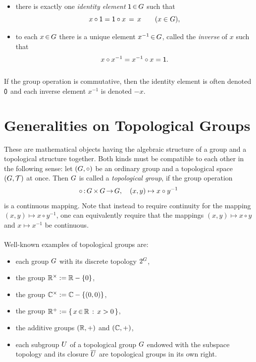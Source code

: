 \documentclass[11pt,twoside]{article}
\begin{document}
\begin{itemize}[leftmargin=12pt,itemsep=1pt]
\item[1.]
there is exactly one \textit{identity element} ${\mathsf{1}} {\,\in\,} G$ such that
\[
x \circ {\mathsf{1}} = {\mathsf{1}} \circ x \,=\, x \quad \quad (x \in G),
\]

\item[2.]
to each $x {\,\in\,} G$ there is a unique element $x^{-1} {\,\in\,} G$,
called the \textit{inverse} of $x$
such that
\[
x \circ x^{-1} = x^{-1} \circ x = {\mathsf{1}}.
\]
\end{itemize}

\subparagraph{}
If the group operation is commutative,
then the identity element is often denoted ${\mathsf{0}}$
and each inverse element $x^{-1}$ is denoted $-x$.

\section{Generalities on Topological Groups}                                   %
These are mathematical objects having the algebraic structure of a group
and a topological structure together.
Both kinds must be compatible to each other in the following sense:
let $(G,\circ)$ be an ordinary group and
a topological space $(G,\mathcal{T})$ at once.
Then $G$ is called a \textit{topological group},
if the group operation
\[
\circ {\,:\,} G {\,\times\,} G {\,\to\,} G,
\quad
(x,y) \mapsto x \circ y^{-1}
\]
is a continuous mapping.
Note that
instead to require continuity for the mapping $(x,y) \mapsto x \circ y^{-1}$,
one can equivalently require
that the mappings $(x,y) \mapsto x \circ y$ and $x \mapsto x^{-1}$
be continuous.

\paragraph{} %
Well-known examples of topological groups are:

\begin{itemize}[leftmargin=9mm,itemsep=1pt]
\item[1.]
each group $G$ with its discrete topology $2^{G}$,

\item[2.]
the group ${\mathbb{R}}^{\times} := {\mathbb{R}} - \{0\}$,

\item[3.]
the group ${\mathbb{C}}^{\times} := {\mathbb{C}} - \{(0,0)\}$,

\item[4.]
the group ${\mathbb{R}}^+ := \{ \, x {\,\in\,} {\mathbb{R}} \,: \, x >0 \, \}$,

\item[5.]
the additive groups $({\mathbb{R}},+)$ and $({\mathbb{C}},+)$,

\item[6.]
each subgroup $U$ of a topological group $G$
endowed with the subspace topology
and its closure $\overline{U}$ are
topological groups in its own right.
\end{itemize}
\end{document}
